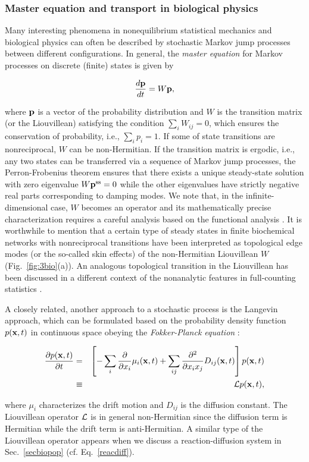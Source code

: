 \documentclass{tADP2e}
\theoremstyle{plain}
\newcommand{\eqn}[1]{
\begin{eqnarray}
	#1
\end{eqnarray}
}
\theoremstyle{plain}
\theoremstyle{definition}
\begin{document}
\subsubsection{Master equation and transport in biological physics\label{secbiomas}}
Many interesting phenomena in nonequilibrium statistical mechanics and biological physics can often be described by stochastic Markov jump processes between different configurations.  
In general, the \emph{master equation} for Markov processes on discrete (finite) states is given by
\eqn{\label{masterstoch}
\frac{d{\bold{p}}}{dt}=W{\bold{p}},
}
where ${\bold{p}}$ is a vector of the probability distribution and $W$ is the transition matrix (or the Liouvillean) satisfying the condition $\sum_{i}W_{ij}=0$, which ensures the conservation of probability, i.e., $\sum_{i}p_i=1$. If some of state transitions are nonreciprocal, $W$ can be non-Hermitian. If the transition matrix is ergodic, i.e., any two states can be transferred via a sequence of Markov jump processes, the Perron-Frobenius theorem ensures that there exists a unique steady-state solution with zero eigenvalue $W{\bold{p}}^{\rm ss}=0$ \cite{SJ76} while the other eigenvalues have strictly negative real parts corresponding to damping modes. 
We note that, in the infinite-dimensional case, $W$ becomes an operator and its mathematically precise characterization requires a careful analysis based on the functional analysis \cite{SH91}. 
It is worthwhile to mention that a certain type of steady states in finite biochemical networks with nonreciprocal transitions have been interpreted as topological edge modes (or the so-called skin effects) of the non-Hermitian Liouvillean $W$ \cite{MA17,DK2018} (Fig.~\ref{fig:3bio}(a)).  An analogous topological transition in the Liouvillean has been discussed in a different context of the nonanalytic features in full-counting statistics \cite{RJ2013}.

A closely related, another approach to a stochastic process is the Langevin approach, which can be formulated based on the probability density function $p({\bf x},t)$ in continuous space obeying the {\emph{Fokker-Planck equation}} \cite{RH96,GCW04}:
\eqn{
\frac{\partial p({\bf x},t)}{\partial t}&=&\left[-\sum_{i}\frac{\partial}{\partial x_i}\mu_i({\bf x},t)+\sum_{ij}\frac{\partial^2}{\partial x_ix_j}D_{ij}({\bf x},t)\right]p({\bf x},t)\nonumber\\
&\equiv&{\cal L}p({\bf x},t),
}
where $\mu_i$ characterizes the drift motion and $D_{ij}$ is the diffusion constant. The Liouvillean operator $\cal L$ is in general non-Hermitian since the diffusion term is Hermitian while the drift term is anti-Hermitian. A similar type of the Liouvillean operator appears when we discuss a reaction-diffusion system in Sec.~\ref{secbiopop} (cf. Eq.~\eqref{reacdiff}). 
\end{document}
